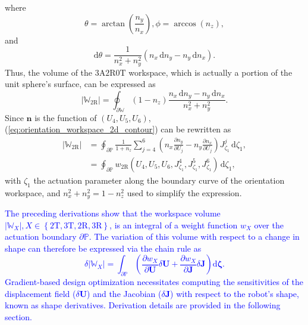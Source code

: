 \documentclass[journal]{IEEEtran}
\theoremstyle{definition}
\begin{document}
where
\begin{equation}
    \theta = \arctan\left(\frac{n_y}{n_x}\right),
    \phi = \arccos\left(n_z\right),
\end{equation}
and
\begin{equation}
    \mathrm{d}\theta = \frac{1}{n_x^2 + n_y^2} \left(n_x \, \mathrm{d}n_y - n_y \, \mathrm{d}n_x\right).
\end{equation}
Thus, the volume of the $3\text{A}2\text{R}0\text{T}$ workspace, which is actually a portion of the unit sphere's surface, can be expressed as
\begin{equation}
  \left|\mathbb{W}_\text{2R}\right| = \oint_{\partial \mathbb{W}} \left(1 - n_z\right) \frac{n_x \, \mathrm{d}n_y - n_y \, \mathrm{d}n_x}{n_x^2 + n_y^2}.
  \label{eq:orientation_workspace_2d_contour}
\end{equation}
Since $\mathbf{n}$ is the function of $\left(U_4, U_5, U_6\right)$, (\ref{eq:orientation_workspace_2d_contour}) can be rewritten as
\begin{equation}
  \begin{split}
    \left|\mathbb{W}_\text{2R}\right| &= \oint_{\partial \mathbb{P}} \frac{1}{1 + n_z} \sum_{j=4}^{6} \left(n_x \frac{\partial n_y}{\partial U_j} - n_y \frac{\partial n_x}{\partial U_j}\right) J^j_{\zeta_1} \, \mathrm{d}\zeta_1, \\
    &= \oint_{\partial \mathbb{P}} w_{\text{2R}} \left(U_4, U_5, U_6, J^4_{\zeta_1}, J^5_{\zeta_1}, J^6_{\zeta_1}\right) \, \mathrm{d}\zeta_1,
  \end{split}
  \label{eq:orientation_workspace_2d_final}
\end{equation}
with \(\zeta_1\) the actuation parameter along the boundary curve of the orientation workspace, and \(n_x^2 + n_y^2 = 1 - n_z^2\) used to simplify the expression. 

\textcolor{blue}{The preceding derivations show that the workspace volume $|\mathbb{W}_X|, X \in \left\{
2\text{T}, 3\text{T}, 2\text{R}, 3\text{R}
\right\}$, is an integral of a weight function $w_X$ over the actuation boundary $\partial \mathbb{P}$. The variation of this volume with respect to a change in shape can therefore be expressed via the chain rule as
\begin{equation}
    \delta |\mathbb{W}_X| = \int_{\partial \mathbb{P}} \left( \frac{\partial w_X}{\partial \mathbf{U}} \delta\mathbf{U} + \frac{\partial w_X}{\partial \mathbf{J}} \delta\mathbf{J} \right) \mathrm{d} \boldsymbol{\zeta}.
    \label{eq:workspace_variation}
\end{equation}
Gradient-based design optimization necessitates computing the sensitivities of the displacement field ($\delta\mathbf{U}$) and the Jacobian ($\delta\mathbf{J}$) with respect to the robot's shape, known as shape derivatives. Derivation details are provided in the following section.}
\end{document}
